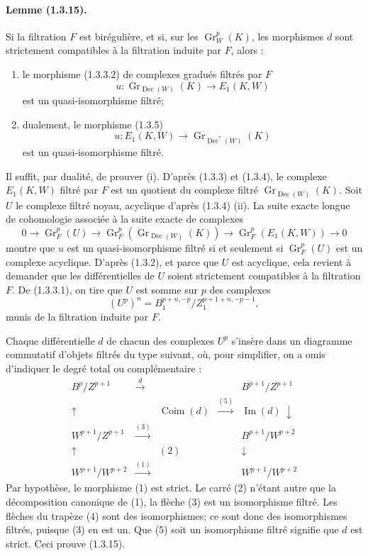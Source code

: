 \documentclass[10pt]{article}
\newcommand{\Gr}{\operatorname{Gr}}
\newcommand{\Coim}{\operatorname{Coim}}
\newcommand{\Imop}{\operatorname{Im}}
\newcommand{\Dec}{\operatorname{Dec}}
\begin{document}
\paragraph{Lemme (1.3.15).} Si la filtration $F$ est birégulière, et si, sur les $\Gr_W^p(K)$, les morphismes $d$ sont strictement compatibles à la filtration induite par $F$, alors :
\begin{enumerate}[label=(\roman*)]
\item le morphisme (1.3.3.2) de complexes gradués filtrés par $F$
\[
u:\Gr_{\Dec(W)}(K)\longrightarrow E_1(K,W)
\]
est un quasi-isomorphisme filtré;
\item dualement, le morphisme (1.3.5)
\[
u:E_1(K,W)\longrightarrow \Gr_{\Dec^*(W)}(K)
\]
est un quasi-isomorphisme filtré.
\end{enumerate}
Il suffit, par dualité, de prouver (i). D'après (1.3.3) et (1.3.4), le complexe $E_1(K,W)$ filtré par $F$ est un quotient du complexe filtré $\Gr_{\Dec(W)}(K)$. Soit $U$ le complexe filtré noyau, acyclique d'après (1.3.4) (ii). La suite exacte longue de cohomologie associée à la suite exacte de complexes
\[
0\to\Gr_F^p(U)\to\Gr_F^p(\Gr_{\Dec(W)}(K))\to\Gr_F^p(E_1(K,W))\to0
\]
montre que $u$ est un quasi-isomorphisme filtré si et seulement si $\Gr_F^p(U)$ est un complexe acyclique. D'après (1.3.2), et parce que $U$ est acyclique, cela revient à demander que les différentielles de $U$ soient strictement compatibles à la filtration $F$. De (1.3.3.1), on tire que $U$ est somme sur $p$ des complexes
\[
(U^p)^n=B_1^{p+n,-p}/Z_1^{p+1+n,-p-1},
\]
munis de la filtration induite par $F$.

Chaque différentielle $d$ de chacun des complexes $U^p$ s'insère dans un diagramme commutatif d'objets filtrés du type suivant, où, pour simplifier, on a omis d'indiquer le degré total ou complémentaire :
\[
\begin{array}{ccccc}
B^p/Z^{p+1} & \xrightarrow{\ d\ } & & & B^{p+1}/Z^{p+1}\\[0.5em]
\uparrow & & \Coim(d) & \xrightarrow{(5)} & \Imop(d)\ \downarrow\\[0.5em]
W^{p+1}/Z^{p+1} & \xrightarrow{(3)} & & & B^{p+1}/W^{p+2}\\[0.5em]
\uparrow & & (2) & & \downarrow\\[0.5em]
W^{p+1}/W^{p+2} & \xrightarrow{(1)} & & & W^{p+1}/W^{p+2}
\end{array}
\]
Par hypothèse, le morphisme (1) est strict. Le carré (2) n'étant autre que la décomposition canonique de (1), la flèche (3) est un isomorphisme filtré. Les flèches du trapèze (4) sont des isomorphismes; ce sont donc des isomorphismes filtrés, puisque (3) en est un. Que (5) soit un isomorphisme filtré signifie que $d$ est strict. Ceci prouve (1.3.15).
\end{document}
